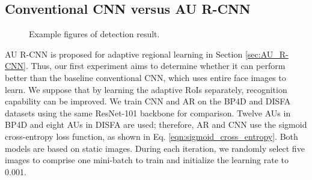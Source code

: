 \documentclass[5p,twocolumn]{elsarticle}
\begin{document}
 



\subsection{Conventional CNN versus AU R-CNN}

\begin{figure}
	\setlength{\abovecaptionskip}{0pt}
	\setlength{\belowcaptionskip}{0pt}
	\begin{adjustbox}{max width=0.5\textwidth,center}
	\end{adjustbox}
	\caption{Example figures of detection result.}
	\label{fig:detection_result}
\end{figure}



AU R-CNN is proposed for adaptive regional learning in Section \ref{sec:AU_R-CNN}. Thus, our first experiment aims to determine whether it can perform better than the baseline conventional CNN, which uses entire face images to learn. We suppose that by learning the adaptive RoIs separately, recognition capability can be improved. We train CNN and AR on the BP4D and DISFA datasets using the same ResNet-101 backbone for comparison. Twelve AUs in BP4D and eight AUs in DISFA are used; therefore, AR and CNN use the sigmoid cross-entropy loss function, as shown in Eq. \ref{eqn:sigmoid_cross_entropy}. Both models are based on static images. During each iteration, we randomly select five images to comprise one mini-batch to train and initialize the learning rate to 0.001.
\end{document}
